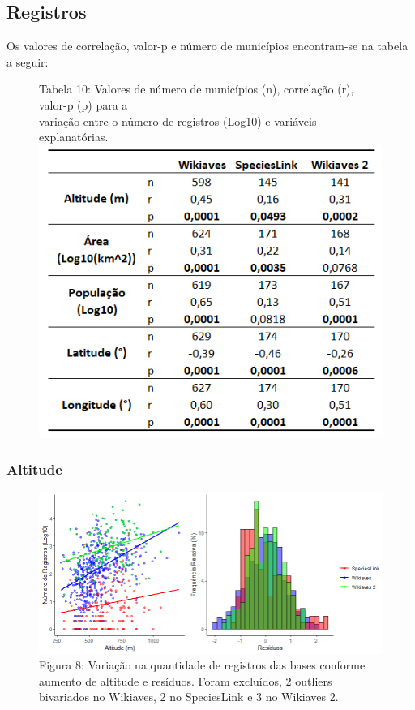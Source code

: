 \documentclass[12pt]{extarticle}
\newenvironment{resposta}{ \color{mygray}}{}
\begin{document}
\hrulefill

\newpage

\subsection{Registros}

\begin{resposta}
Os valores de correlação, valor-p e número de municípios encontram-se na tabela a seguir:
\end{resposta}


\begin{figure}[h!]
\centering
{\scriptsize Tabela 10: Valores de número de municípios (n), correlação (r), valor-p (p) para a\\ variação entre o número de registros (Log10) e variáveis explanatórias. }
\includegraphics{Imagens/T10.png}
\end{figure}

 

\subsubsection{Altitude}

\begin{figure}[h!]
\centering
\includegraphics[width = 15cm]{Imagens/G01.png}
\\{\scriptsize Figura 8: Variação na quantidade de registros das bases conforme aumento de altitude e resíduos. Foram excluídos, 2 outliers bivariados no Wikiaves, 2 no SpeciesLink e 3 no Wikiaves 2. }
\end{figure}
\newpage
\end{document}
